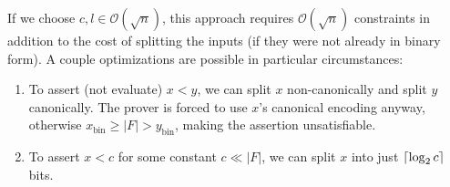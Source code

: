 \documentclass{article}
\DeclarePairedDelimiter\ceil{\lceil}{\rceil}
\begin{document}
If we choose $c, l \in \mathcal{O}(\sqrt{n})$, this approach requires $\mathcal{O}(\sqrt{n})$ constraints in addition to the cost of splitting the inputs (if they were not already in binary form). A couple optimizations are possible in particular circumstances:
\begin{enumerate}
  \item To assert (not evaluate) $x < y$, we can split $x$ non-canonically and split $y$ canonically. The prover is forced to use $x$'s canonical encoding anyway, otherwise $x_\mathrm{bin} \ge |F| > y_\mathrm{bin}$, making the assertion unsatisfiable.
  \item To assert $x < c$ for some constant $c \ll |F|$, we can split $x$ into just $\ceil{\log_2 c}$ bits.
\end{enumerate}


{}

\end{document}
